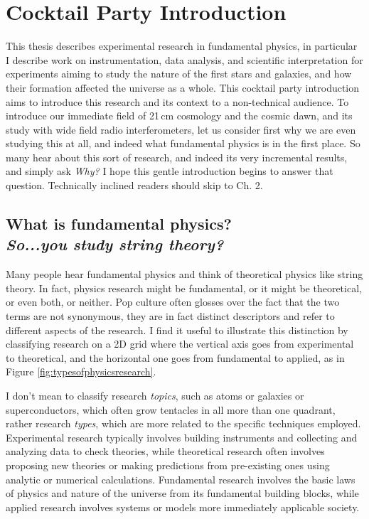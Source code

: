 \chapter{Cocktail Party Introduction}

This thesis describes experimental research in fundamental physics, in particular I describe work on instrumentation, data analysis, and scientific interpretation for experiments aiming to study the nature of the first stars and galaxies, and how their formation affected the universe as a whole. This cocktail party introduction aims to introduce this research and its context to a non-technical audience. To introduce our immediate field of 21\,cm cosmology and the cosmic dawn, and its study with wide field radio interferometers, let us consider first why we are even studying this at all, and indeed what fundamental physics is in the first place. So many hear about this sort of research, and indeed its very incremental results, and simply ask \emph{Why?} I hope this gentle introduction begins to answer that question. Technically inclined readers should skip to Ch. 2.

\section[What is fundamental physics? \emph{So...you study string theory?}]{What is fundamental physics?\\ \emph{\large{So...you study string theory?}}}

Many people hear fundamental physics and think of theoretical physics like string theory. In fact, physics research might be fundamental, or it might be theoretical, or even both, or neither. Pop culture often glosses over the fact that the two terms are not synonymous, they are in fact distinct descriptors and refer to different aspects of the research. I find it useful to illustrate this distinction by classifying research on a 2D grid where the vertical axis goes from experimental to theoretical, and the horizontal one goes from fundamental to applied, as in Figure \ref{fig:typesofphysicsresearch}. 

I don't mean to classify research \emph{topics}, such as atoms or galaxies or superconductors, which often grow tentacles in all more than one quadrant, rather research \emph{types}, which are more related to the specific techniques employed. Experimental research typically involves building instruments and collecting and analyzing data to check theories, while theoretical research often involves proposing new theories or making predictions from pre-existing ones using analytic or numerical calculations. Fundamental research involves the basic laws of physics and nature of the universe from its fundamental building blocks, while applied research involves systems or models more immediately applicable society. 

